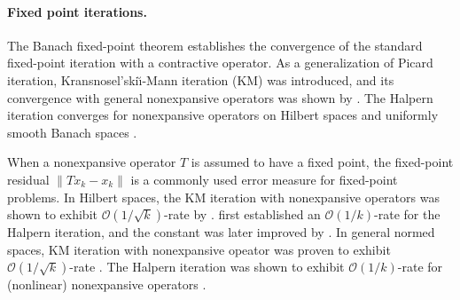 \documentclass{article} %
\newcommand{\norm}[1]{\left\|{#1}\right\|}
\begin{document}



\paragraph{Fixed point iterations.}
The Banach fixed-point theorem \citep{banach1922operations} establishes the convergence of the standard fixed-point iteration with a contractive operator. 
As a generalization of Picard iteration, Kransnosel'ski\u\i-Mann iteration (KM) \citep{mann1953mean, krasnosel1955two} was introduced, and its convergence with general nonexpansive operators was shown by \citet{Martinet1970ppm}. 
The Halpern iteration \citep{halpern1967fixed} converges for nonexpansive operators on Hilbert spaces \citep{wittmann1992approximation} and uniformly smooth Banach spaces \citep{reich1980strong, xu2002iterative}.

When a nonexpansive operator $T$ is assumed to have a fixed point, the fixed-point residual $\norm{Tx_k-x_k}$ is a commonly used error measure for fixed-point problems. In Hilbert spaces, the KM iteration with nonexpansive operators was shown to exhibit $\mathcal{O}(1/\sqrt{k})$-rate by \citet{ matsushita2017convergence}. %
\citet{sabach2017first} first established an $\mathcal{O}(1/k)$-rate for the Halpern iteration, and the constant was later improved by \citet{Lieder2021halpern, kim2021accelerated}. In general normed spaces, 
KM iteration with nonexpansive opeator was proven to exhibit $\mathcal{O}(1/\sqrt{k})$-rate \citep{baillon1992optimal, cominetti2014rate, bravo2018sharp}. The Halpern iteration was shown to exhibit $\mathcal{O}(1/k)$-rate for (nonlinear) nonexpansive operators \citep{leustean2007rates, sabach2017first, contreras2022optimal}. 
\end{document}
